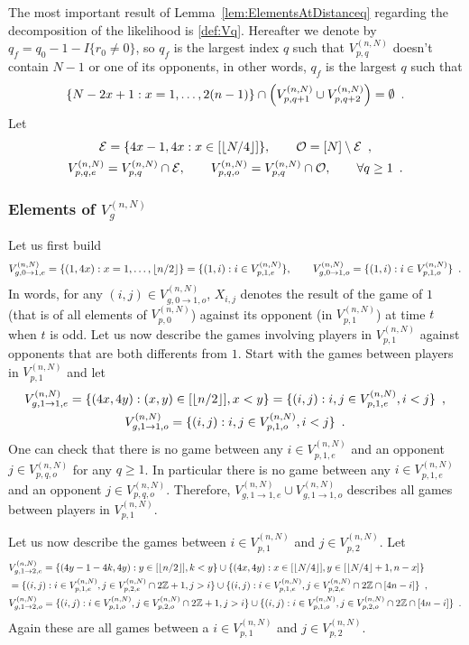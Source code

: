 The most important result of Lemma~\ref{lem:ElementsAtDistanceq} regarding the decomposition of the likelihood is \eqref{def:Vq}. Hereafter we denote by $q_f=q_0-1-I\{r_0\ne 0\}$, so $q_f$ is the largest index $q$ such that $V_{p,q}^{(n,N)}$ doesn't contain $N-1$ or one of its opponents, in other words, $q_f$ is the largest $q$ such that
\[
 \{N-2x+1 : x=1,\ldots, 2(n-1)\}\cap\left(V_{p,q+1}^{(n,N)}\cup V_{p,q+2}^{(n,N)}\right)=\emptyset\enspace.
 \] 
Let 
\begin{gather*}
\mathcal{E}=\{4x-1,4x : x\in[\left\lfloor N/4\right\rfloor]\},\qquad \mathcal{O}=[N]\setminus\mathcal{E}\enspace,\\
V_{p,q,e}^{(n,N)}= V_{p,q}^{(n,N)}\cap \mathcal{E},\qquad V_{p,q,o}^{(n,N)}= V_{p,q}^{(n,N)}\cap \mathcal{O},\qquad\forall q\ge 1\enspace. 
\end{gather*}

\subsubsection{Elements of $V_g^{(n,N)}$}

Let us first build 
\[
V_{g,0\to1,e}^{(n,N)}=\{(1,4x) : x=1,\ldots,\left\lfloor n/2\right\rfloor\}=\{(1,i) : i\in V_{p,1,e}^{(n,N)}\},\qquad V_{g,0\to1,o}^{(n,N)}=\{(1,i) : i\in V_{p,1,o}^{(n,N)}\}\enspace.
\]
In words, for any $(i,j)\in V_{g,0\to1,o}^{(n,N)}$, $X_{i,j}$ denotes the result of the game of $1$ (that is of all elements of $V_{p,0}^{(n,N)}$) against its opponent (in $V_{p,1}^{(n,N)}$) at time $t$ when $t$ is odd. Let us now describe the games involving players in $V_{p,1}^{(n,N)}$ against opponents that are both differents from $1$. Start with the games between players in $V_{p,1}^{(n,N)}$ and let 
\begin{gather*}
V_{g,1\to1,e}^{(n,N)}=\{(4x,4y) : (x,y)\in [\left\lfloor n/2\right\rfloor], x< y\}=\{(i,j) : i,j\in V_{p,1,e}^{(n,N)},i<j\}\enspace,\\
V_{g,1\to1,o}^{(n,N)}=\{(i,j) : i,j\in V_{p,1,o}^{(n,N)},i<j\}\enspace. 
\end{gather*}
One can check that there is no game between any $i\in V_{p,1,e}^{(n,N)}$ and an opponent $j\in V_{p,q,o}^{(n,N)}$ for any $q\ge 1$. 
In particular there is no game between any $i\in V_{p,1,e}^{(n,N)}$ and an opponent $j\in V_{p,q,o}^{(n,N)}$.  Therefore, $V_{g,1\to1,e}^{(n,N)}\cup V_{g,1\to1,o}^{(n,N)}$ describes all games between players in $V_{p,1}^{(n,N)}$. 

Let us now describe the games between $i\in V_{p,1}^{(n,N)}$ and $j\in V_{p,2}^{(n,N)}$. Let 
\begin{align*}
&V_{g,1\to2,e}^{(n,N)}=\{(4y-1-4k,4y) : y\in [\left\lfloor n/2\right\rfloor], k<y\}\cup\{(4x,4y) : x\in[\left\lfloor N/4\right\rfloor], y\in[\left\lfloor N/4\right\rfloor+1,n-x]\}\\
&=\{(i,j) : i\in V_{p,1,e}^{(n,N)},j\in V_{p,2,e}^{(n,N)}\cap 2\mathbb{Z}+1,j>i\}\cup\{(i,j) : i\in V_{p,1,e}^{(n,N)},j\in V_{p,2,e}^{(n,N)}\cap 2\mathbb{Z}\cap [4n-i]\}\enspace,\\
&V_{g,1\to2,o}^{(n,N)}=\{(i,j) : i\in V_{p,1,o}^{(n,N)},j\in V_{p,2,o}^{(n,N)}\cap 2\mathbb{Z}+1,j>i\}\cup\{(i,j) : i\in V_{p,1,o}^{(n,N)},j\in V_{p,2,o}^{(n,N)}\cap 2\mathbb{Z}\cap [4n-i]\}\enspace.
\end{align*}
Again these are all games between a $i\in V_{p,1}^{(n,N)}$ and $j\in V_{p,2}^{(n,N)}$.

